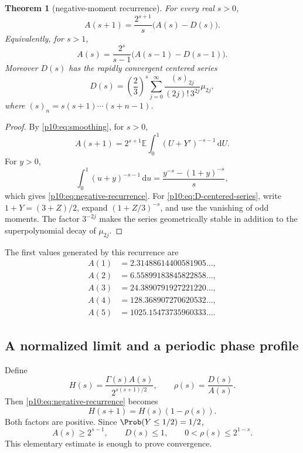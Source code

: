 \documentclass[11pt,oneside]{article}
\newtheorem{theorem}{Theorem}[section]
\theoremstyle{definition}
\theoremstyle{remark}
\newcommand{\E}{\mathbb E}
\newcommand{\dd}{\,\mathrm d}
\newcommand{\1}{\mathbf 1}
\begin{document}
\begin{theorem}[negative-moment recurrence]\label{p10:thm:negative-recurrence}
For every real \(s>0\),
\begin{equation}\label{p10:eq:negative-recurrence}
 A(s+1)=\frac{2^{s+1}}s\bigl(A(s)-D(s)\bigr).
\end{equation}
Equivalently, for \(s>1\),
\begin{equation}\label{p10:eq:negative-recurrence-shifted}
 A(s)=\frac{2^s}{s-1}\bigl(A(s-1)-D(s-1)\bigr).
\end{equation}
Moreover \(D(s)\) has the rapidly convergent centered series
\begin{equation}\label{p10:eq:D-centered-series}
 D(s)=\left(\frac23\right)^s
 \sum_{j=0}^{\infty}
 \frac{(s)_{2j}}{(2j)!\,3^{2j}}\mu_{2j},
\end{equation}
where \((s)_n=s(s+1)\cdots(s+n-1)\).
\end{theorem}

\begin{proof}
By \cref{p10:eq:smoothing}, for \(s>0\),
\[
 A(s+1)=2^{s+1}\E\int_0^1(U+Y')^{-s-1}\dd U.
\]
For \(y>0\),
\[
 \int_0^1(u+y)^{-s-1}\dd u
 =\frac{y^{-s}-(1+y)^{-s}}s,
\]
which gives \cref{p10:eq:negative-recurrence}.  For \cref{p10:eq:D-centered-series}, write
\(1+Y=(3+Z)/2\), expand \((1+Z/3)^{-s}\), and use the vanishing of odd moments.
The factor \(3^{-2j}\) makes the series geometrically stable in addition to the
superpolynomial decay of \(\mu_{2j}\).
\end{proof}

The first values generated by this recurrence are
\begin{align}
 A(1)&=2.31488614400581905\ldots,\nonumber\\
 A(2)&=6.55899183845822858\ldots,\nonumber\\
 A(3)&=24.3890791927221220\ldots,\nonumber\\
 A(4)&=128.368907270620532\ldots,\nonumber\\
 A(5)&=1025.15473735960333\ldots.\label{p10:eq:negative-values}
\end{align}

\subsection{A normalized limit and a periodic phase profile}

Define
\begin{equation}\label{p10:eq:H-def}
 H(s)=\frac{\Gamma(s)A(s)}{2^{s(s+1)/2}},
 \qquad
 \rho(s)=\frac{D(s)}{A(s)}.
\end{equation}
Then \cref{p10:eq:negative-recurrence} becomes
\begin{equation}\label{p10:eq:H-recurrence}
 H(s+1)=H(s)(1-\rho(s)).
\end{equation}
Both factors are positive.  Since \(\Prob(Y\le1/2)=1/2\),
\begin{equation}\label{p10:eq:rho-bound}
 A(s)\ge2^{s-1},\qquad D(s)\le1,
 \qquad 0<\rho(s)\le2^{1-s}.
\end{equation}
This elementary estimate is enough to prove convergence.
\end{document}
